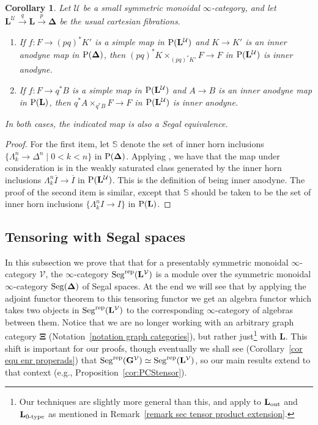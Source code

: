 \documentclass{amsart}
\numberwithin{theorem}{subsection}
\newtheorem{corollary}[theorem]{Corollary}
\theoremstyle{definition}
\newcommand{\xU}{\mathcal{U}}
\newcommand{\xV}{\mathcal{V}}
\newcommand{\olI}{\overline{I}}
\newcommand{\Pre}{\name{P}}
\newcommand{\icat}{$\infty$-category}
\newcommand{\name}[1]{\ensuremath{\text{\textup{#1}}}}
\newcommand{\simp}{\mathbf{\Delta}}
\newcommand{\levelg}{\mathbf{L}}
\newcommand{\levelV}{\levelg^\xV}
\newcommand{\levelU}{\levelg^\xU}
\newcommand{\bbY}{\mathbf{G}}
\newcommand{\bbYV}{\bbY^{\xV}}
\newcommand{\gc}{\mathbf{\Xi}}
\newcommand{\Seg}{\name{Seg}}
\newcommand{\Segrep}{\Seg^{\name{rep}}}
\begin{document}
\begin{corollary}\label{cor pb of inner anodyne}
Let $\xU$ be a small symmetric monoidal \icat{}, and let $\levelU \xrightarrow{q} \levelg \xrightarrow{p} \simp$ be the usual cartesian fibrations.
\begin{enumerate}
\item If $f\colon F\to (pq)^*K'$ is a simple map in $\Pre(\levelU)$ and $K\to K'$ is an inner anodyne map in $\Pre(\simp)$, then $(pq)^*K \times_{(pq)^*K'}F \to F$ in $\Pre(\levelU)$ is inner anodyne.
\item If $f\colon F \to q^*B$ is a simple map in $\Pre(\levelU)$ and $A\to B$ is an inner anodyne map in $\Pre(\levelg)$, then $q^*A \times_{q^*B} F \to F$ in $\Pre(\levelU)$ is inner anodyne.
\end{enumerate}
In both cases, the indicated map is also a Segal equivalence.
\end{corollary}
\begin{proof}
For the first item, let $\mathbb{S}$ denote the set of inner horn inclusions $\{\Lambda^n_k\to \Delta^n \mid 0<k<n \}$ in $\Pre(\simp)$. 
Applying \cite[Lemma 2.7.14]{ChuHaugseng}, we have that the map under consideration is in the weakly saturated class generated by the inner horn inclusions $\Lambda^n_k\olI\to \olI$ in $\Pre(\levelU)$.
This is the definition of being inner anodyne.
The proof of the second item is similar, except that $\mathbb{S}$ should be taken to be the set of inner horn inclusions $\{ \Lambda^n_k I \to I\}$ in $\Pre(\levelg)$.
\end{proof}

\subsection{Tensoring with Segal spaces}\label{sec tensor product}
In this subsection we prove that that for a presentably symmetric monoidal \icat{} $\xV$, the \icat{} $\Segrep(\levelV)$ is a module over the symmetric monoidal \icat{} $\Seg(\simp)$ of Segal spaces.
At the end we will see that by applying the adjoint functor theorem to this tensoring functor we get an algebra functor which takes two objects in $\Segrep(\levelV)$ to the corresponding $\infty$-category of algebras between them.
Notice that we are no longer working with an arbitrary graph category $\gc$ (Notation~\ref{notation graph categories}), but rather just\footnote{Our techniques are slightly more general than this, and apply to $\levelg_{\name{out}}$ and $\levelg_{\name{0-type}}$ as mentioned in Remark~\ref{remark sec tensor product extension}.} with $\levelg$.
This shift is important for our proofs, though eventually we shall see (Corollary~\ref{cor equ enr properads}) that $\Segrep(\bbYV) \simeq \Segrep(\levelV)$, so our main results extend to that context (e.g., Proposition~\ref{cor:PCStensor}).
\end{document}

